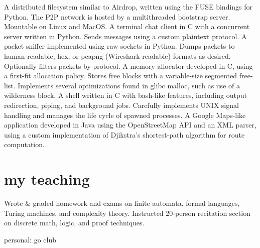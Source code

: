 \documentclass{cv}
\begin{document}
\begin{entrylist}
    {A distributed filesystem similar to Airdrop, written using the FUSE bindings for Python. The P2P network is hosted by a multithreaded bootstrap server. Mountable on Linux and MacOS.}
    {A terminal chat client in C with a concurrent server written in Python. Sends messages using a custom plaintext protocol.}
    {A packet sniffer implemented using raw sockets in Python. Dumps packets to human-readable, hex, or pcapng (Wireshark-readable) formats as desired. Optionally filters packets by protocol.}
    {A memory allocator developed in C, using a first-fit allocation policy. Stores free blocks with a variable-size segmented free-list. Implements several optimizations found in glibc malloc, such as use of a wilderness block.}
    {A shell written in C with bash-like features, including output redirection, piping, and background jobs. Carefully implements UNIX signal handling and manages the life cycle of spawned processes.}
    {A Google Maps-like application developed in Java using the OpenStreetMap API and an XML parser, using a custom implementation of Djikstra's shortest-path algorithm for route computation.}
\end{entrylist}

\section{my teaching}

\begin{entrylist}
    {Wrote \& graded homework and exams on finite automata, formal languages, Turing machines, and complexity theory.}
    {Instructed 20-person recitation section on discrete math, logic, and proof techniques.}
\end{entrylist}

personal: go club
\end{document}
